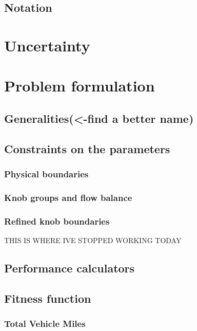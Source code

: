 \subsection{Notation}
\label{subsec:notation}



\section{Uncertainty}
\label{sec:uncertainty}



\section{Problem formulation}
\subsection{Generalities(<-find a better name)}
\label{subsec:problem_formulation_intro}

\subsection{Constraints on the parameters}
\label{subsec:constraintsintro}

\subsubsection{Physical boundaries}
\label{subsubsec:naive}

\subsubsection{Knob groups and flow balance}
\label{subsubsec:knob_groups}

\subsubsection{Refined knob boundaries}
\label{subsubsec:refined}

\color{red}THIS IS WHERE IVE STOPPED WORKING TODAY\color{black}
\subsection{Performance calculators}
\label{subsec:pcs}

\subsection{Fitness function}
\label{fitnessintro}

\subsubsection{Total Vehicle Miles}
\label{subsubsec:tvm}

